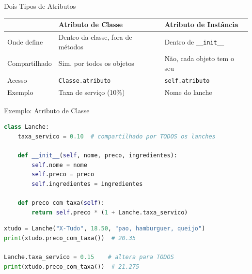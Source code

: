 \documentclass[aspectratio=169]{beamer}
\begin{document}
\begin{frame}{Dois Tipos de Atributos}
  \begin{table}
    \centering
    \small
    \begin{tabular}{lll}
      \toprule
      & \textbf{Atributo de Classe} & \textbf{Atributo de Instância} \\
      \midrule
      Onde define  & Dentro da classe, fora de métodos & Dentro de \texttt{\_\_init\_\_} \\
      Compartilhado & Sim, por todos os objetos & Não, cada objeto tem o seu \\
      Acesso       & \texttt{Classe.atributo} & \texttt{self.atributo} \\
      Exemplo      & Taxa de serviço (10\%) & Nome do lanche \\
      \bottomrule
    \end{tabular}
  \end{table}
\end{frame}

\begin{frame}{Exemplo: Atributo de Classe}
  \begin{lstlisting}[language=Python]
class Lanche:
    taxa_servico = 0.10  # compartilhado por TODOS os lanches

    def __init__(self, nome, preco, ingredientes):
        self.nome = nome
        self.preco = preco
        self.ingredientes = ingredientes

    def preco_com_taxa(self):
        return self.preco * (1 + Lanche.taxa_servico)
  \end{lstlisting}

  \begin{lstlisting}[language=Python]
xtudo = Lanche("X-Tudo", 18.50, "pao, hamburguer, queijo")
print(xtudo.preco_com_taxa())  # 20.35

Lanche.taxa_servico = 0.15    # altera para TODOS
print(xtudo.preco_com_taxa())  # 21.275
  \end{lstlisting}
\end{frame}
\end{document}
